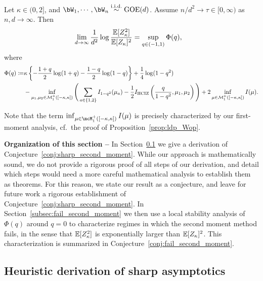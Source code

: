 \begin{conjecture}\label{conj:sharp_second_moment}
    Let $\kappa \in (0,2]$, and $\bW_1, \cdots, \bW_n \iid \GOE(d)$.
    Assume $n/d^2 \to \tau \in [0, \infty)$ as $n, d\to \infty$. 
    Then
    \begin{align}
        \label{eq:limit_2nd_moment}
    &\lim_{d \to \infty}\frac{1}{d^2} \log \frac{\mathbb{E}[Z_\kappa^2]}{\mathbb{E}[Z_\kappa]^2} = 
   \sup_{q \in (-1,1)} \Phi(q),
    \end{align}
    where 
    \begin{align}\label{eq:def_Phiq}
    \Phi(q) \coloneqq &\kappa \left\{- \frac{1+q}{2} \log (1+q) - \frac{1-q}{2} \log (1-q) \right\} + \frac{1}{4} \log (1-q^2) \\ 
    \nonumber
    &- \inf_{\mu_1, \mu_2 \in \mathcal{M}_1^+([-\kappa, \kappa])}
        \Bigg( \sum_{a \in \{1,2\}} I_{1-q^2}(\mu_a)
        - \frac{1}{2} I_{\mathrm{HCIZ}}\left(\frac{q}{1-q^2}, \mu_1, \mu_2\right)\Bigg)
        + 2 \inf_{\mu \in \mathcal{M}_1^+([-\kappa, \kappa])}
        I(\mu).
\end{align}
\end{conjecture}
\noindent
Note that the term $\inf_{\mu \in \mcM_1^+([-\kappa,\kappa])} I(\mu)$ is precisely characterized by our first-moment analysis, cf.\ the proof of Proposition~\ref{prop:ldp_Wop}.

\myskip
\textbf{Organization of this section --}
In Section~\ref{subsec:sharp_second_moment} we give a derivation of Conjecture~\ref{conj:sharp_second_moment}.
While our approach is mathematically sound, we do not provide a rigorous proof of all steps of our derivation, and detail which steps would need a more careful mathematical analysis to establish them as theorems. 
For this reason, we state our result as a conjecture, and leave for future work a rigorous establishment of Conjecture~\ref{conj:sharp_second_moment}.
In Section~\ref{subsec:fail_second_moment} we then use a local stability analysis of $\Phi(q)$ around $q = 0$ 
to characterize regimes in which the second moment method fails, in the sense that $\mathbb{E}[Z_\kappa^2]$ is exponentially larger than $\mathbb{E}[Z_\kappa]^2$. This characterization is summarized in Conjecture~\ref{conj:fail_second_moment}.

\subsection{Heuristic derivation of sharp asymptotics}\label{subsec:sharp_second_moment}

